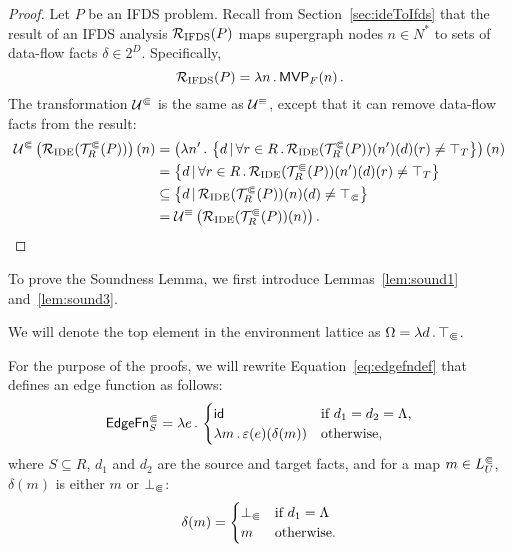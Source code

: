 \precision*
\begin{proof}
  Let $P$ be an IFDS problem. Recall from Section~\ref{sec:ideToIfds} that the result of an IFDS analysis $\mathcal R_{\text{IFDS}}(P)$ maps supergraph
  nodes $n\in N^*$ to sets of data-flow facts $\delta\in2^D$. Specifically,
  \begin{equation}
    \mathcal R_{\text{IFDS}}(P)=\lambda n\,.\,\textsf{MVP}_{F}(n)\,.
  \end{equation}
  The transformation $\mathcal U^\Subset$ is the same as $\mathcal U^\equiv$, except that it can remove data-flow facts from the result:
  \begin{align*}
    \mathcal U^\Subset\left(\mathcal R_{\text{IDE}}(\mathcal T^\Subset_R(P))\right)(n)
    &=\left(\lambda n'\,.\,\left\{d\,|\,\forall r\in R\,.\,\mathcal R_{\text{IDE}}(\mathcal T^\Subset_R(P))(n')(d)(r)\ne\top_T\right\}\right)(n)\\
    &=\left\{d\,|\,\forall r\in R\,.\,\mathcal R_{\text{IDE}}(\mathcal T^\Subset_R(P))(n')(d)(r)\ne\top_T\right\}\\
    &\subseteq\left\{d\,|\,\mathcal R_{\text{IDE}}(\mathcal T^\Subset_R(P))(n)(d)\ne\top_\Subset\right\}\\
    &=\mathcal U^\equiv\left(\mathcal R_{\text{IDE}}(\mathcal T^\Subset_R(P))(n)\right).\qedhere
  \end{align*}
\end{proof}

To prove the Soundness Lemma, we first introduce Lemmas~\ref{lem:sound1} and~\ref{lem:sound3}.

We will denote the top element in the environment lattice as
$\Omega=\lambda d\,.\,\top_\Subset$.

For the purpose of the proofs, we will rewrite Equation~\eqref{eq:edgefndef} that defines an edge function as follows:
  \begin{equation}\label{eq:edgefnThroughDelta}
    \textsf{EdgeFn}^\Subset_{S}=\lambda e\,.\,
    \begin{cases}
      \textsf{id}&\text{if $d_1=d_2=\Lambda$,}\\
      \lambda m\,.\,\varepsilon(e)(\delta(m))&\text{otherwise},
    \end{cases}
  \end{equation}
  where $S\subseteq R$, $d_1$ and $d_2$ are the source and target facts, and for a map $m\in L^\Subset_U$, $\delta(m)$ is either $m$ or $\bot_\Subset$:
  \begin{equation}\label{eq:deltadef}
    \delta(m)=\begin{cases}
      \bot_\Subset&\text{if $d_1=\Lambda$}\\
      m&\text{otherwise.}
    \end{cases}
  \end{equation}

